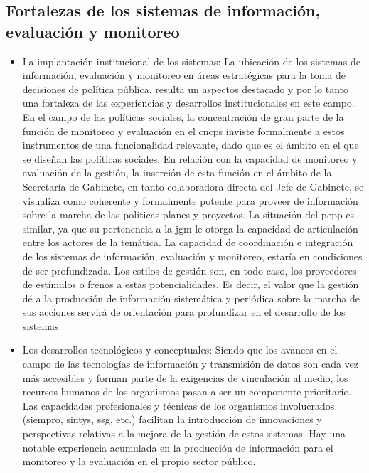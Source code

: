 \subsection{Fortalezas de los sistemas de información, evaluación y monitoreo}
    \begin{itemize}
        \item La implantación institucional de los sistemas: La ubicación de los sistemas de información, evaluación y monitoreo en áreas estratégicas para la toma de decisiones de política pública, resulta un aspectos destacado y por lo tanto una fortaleza de las experiencias y desarrollos institucionales en este campo. En el campo de las políticas sociales, la concentración de gran parte de la función de monitoreo y evaluación en el \ac{cncps} inviste formalmente a estos instrumentos de una funcionalidad relevante, dado que es el ámbito en el que se diseñan las políticas sociales. En relación con la capacidad de monitoreo y evaluación de la gestión, la inserción de esta función en el ámbito de la Secretaría de Gabinete, en tanto colaboradora directa del Jefe de Gabinete, se visualiza como coherente y formalmente potente para proveer de información sobre la marcha de las políticas planes y proyectos. La situación del \ac{pepp} es similar, ya que su pertenencia a la \ac{jgm} le otorga la capacidad de articulación entre los actores de la temática. La capacidad de coordinación e integración de los sistemas de información, evaluación y monitoreo, estaría en condiciones de ser profundizada. Los estilos de gestión son, en todo caso, los proveedores de estímulos o frenos a estas potencialidades. Es decir, el valor que la gestión dé a la producción de información sistemática y periódica sobre la marcha de sus acciones servirá de orientación para profundizar en el desarrollo de los sistemas.
        \item Los desarrollos tecnológicos y conceptuales: Siendo que los avances en el campo de las tecnologías de información y transmisión de datos son cada vez más accesibles y forman parte de la exigencias de vinculación al medio, los recursos humanos de los organismos pasan a ser un componente prioritario.  Las capacidades profesionales y técnicas de los organismos involucrados (\ac{siempro}, \ac{sintys}, \ac{ssg}, etc.) facilitan la introducción de innovaciones y perspectivas relativas a la mejora de la gestión de estos sistemas. Hay una notable experiencia acumulada en la producción de información para el monitoreo y la evaluación en el propio sector público.
    \end{itemize}

